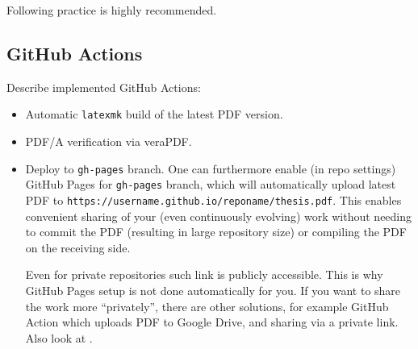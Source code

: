 \vspace{1ex}
Following practice is highly recommended.

\subsection{GitHub Actions}%
\label{sub:GitHub Actions}

Describe implemented \textsf{GitHub Actions}:
\begin{itemize}
    \item Automatic \texttt{latexmk} build of the latest PDF version.
    \item PDF/A verification via \textsf{veraPDF}.
    \item Deploy to \texttt{gh-pages} branch.
          One can furthermore enable (in repo settings) \textsf{GitHub Pages} for \texttt{gh-pages} branch, which will automatically upload latest PDF to \texttt{https://username.github.io/reponame/thesis.pdf}.
          This enables convenient sharing of your (even continuously evolving) work without needing to commit the PDF (resulting in large repository size) or compiling the PDF on the receiving side.
          \begin{remark}
              Even for private repositories such link is publicly accessible.
              This is why \textsf{GitHub Pages} setup is not done automatically for you.
              If you want to share the work more \enquote{privately}, there are other solutions, for example \textsf{GitHub Action} which uploads PDF to \textsf{Google Drive}, and sharing via a private link.
              Also look at .
          \end{remark}
\end{itemize}

